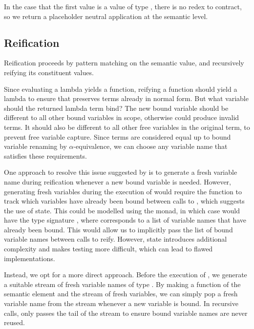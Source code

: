 In the case that the first value is a value  of type , there is no redex to contract, so we return a placeholder neutral application at the semantic level.


\subsection{Reification}


Reification proceeds by pattern matching on the semantic value, and recursively reifying its constituent values.

Since evaluating a lambda yields a function, reifying a function should yield a lambda to ensure that  preserves terms already in normal form. But what variable should the returned lambda term bind? The new bound variable should be different to all other bound variables in scope, otherwise  could produce invalid terms. It should also be different to all other free variables in the original term, to prevent free variable capture. Since terms are considered equal up to bound variable renaming by $\alpha$-equivalence, we can choose any variable name that satisfies these requirements. 

One approach to resolve this issue suggested by \cite{slides} is to generate a fresh variable name during reification whenever a new bound variable is needed. However, generating fresh variables during the execution of  would require the function to track which variables have already been bound between calls to , which suggests the use of state. This could be modelled using the  monad, in which case  would have the type signature , where \code{[Name]} corresponds to a list of variable names that have already been bound. This would allow us to implicitly pass the list of bound variable names between calls to reify. However, state introduces additional complexity and makes testing more difficult, which can lead to flawed implementations.


Instead, we opt for a more direct approach. Before the execution of , we generate a suitable stream of fresh variable names of type \code{[Name]}. By making  a function of the semantic element and the stream of fresh variables, we can simply pop a fresh variable name from the stream whenever a new variable is bound. In recursive calls,  only passes the tail of the stream to ensure bound variable names are never reused.

